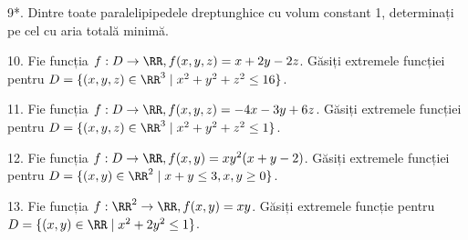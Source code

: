9*. Dintre toate paralelipipedele dreptunghice cu volum constant 1, determinați
pe cel cu aria totală minimă.

\vspace{0.3cm}

10. Fie funcția $ f : D \to \RR, f(x, y, z) = x + 2y - 2z $.
Găsiți extremele funcției pentru $ D = \{ (x, y, z) \in \RR^3 \mid x^2 + y^2 + z^2 \leq 16 \} $.

\vspace{0.3cm}

11. Fie funcția $ f : D \to \RR, f(x, y, z) = -4x - 3y + 6z $.
Găsiți extremele funcției pentru $ D = \{ (x, y, z) \in \RR^3 \mid x^2 + y^2 + z^2 \leq 1 \} $.

\vspace{0.3cm}

12. Fie funcția $ f : D \to \RR, f(x, y) = xy^2(x + y - 2) $. Găsiți extremele funcției
pentru $ D = \{ (x, y) \in \RR^2 \mid x + y \leq 3, x, y \geq 0 \} $.

\vspace{0.3cm}

13. Fie funcția $ f : \RR^2 \to \RR, f(x, y) = xy $. Găsiți extremele funcție pentru
$ D = \{ (x, y) \in \RR \mid x^2 + 2y^2 \leq 1 \} $.

